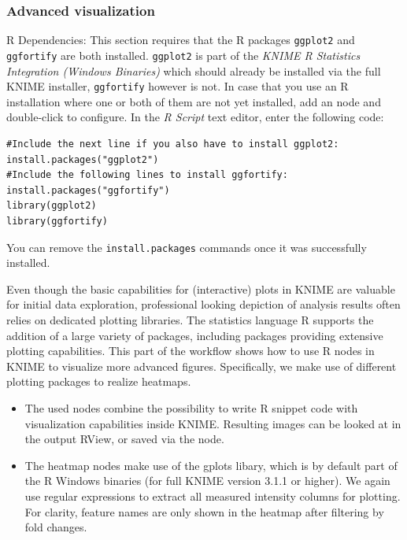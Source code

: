 \subsubsection{Advanced visualization}
\label{sec:metaboR}
R Dependencies: This section requires that the R packages \texttt{ggplot2} and \texttt{ggfortify} are both installed. \texttt{ggplot2} is part of the \textit{KNIME R Statistics Integration (Windows Binaries)} which should already be installed via the full KNIME installer, \texttt{ggfortify} however is not.
In case that you use an R installation where one or both of them are not yet installed, add an  node and double-click to configure. In the \textit{R Script} text editor, enter the following code:
\begin{listing}
\begin{verbatim}
#Include the next line if you also have to install ggplot2:
install.packages("ggplot2")
#Include the following lines to install ggfortify:
install.packages("ggfortify")
library(ggplot2)
library(ggfortify)
\end{verbatim}
\end{listing}
You can remove the \texttt{install.packages} commands once it was successfully installed.

Even though the basic capabilities for (interactive) plots in KNIME are valuable for initial data exploration, professional looking depiction of analysis results often relies on dedicated plotting libraries. The statistics language R supports the addition of a large variety of packages, including packages providing extensive plotting capabilities. This part of the workflow shows how to use R nodes in KNIME to visualize more advanced figures. Specifically, we make use of different plotting packages to realize heatmaps.


\begin{itemize}
\item The used  nodes combine the possibility to write R snippet code with visualization capabilities inside KNIME. Resulting images can be looked at in the output RView, or saved via the  node.
\item The heatmap nodes make use of the gplots libary, which is by default part of the R Windows binaries (for full KNIME version 3.1.1 or higher). We again use regular expressions to extract all measured intensity columns for plotting. For clarity, feature names are only shown in the heatmap after filtering by fold changes.
\end{itemize}

